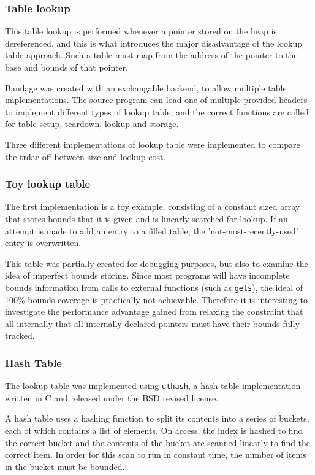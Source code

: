 \subsubsection{Table lookup}

This table lookup is performed whenever a pointer stored on the heap is dereferenced, and this is what introduces the major disadvantage of the lookup table approach.
Such a table must map from the address of the pointer to the base and bounds of that pointer.

Bandage was created with an exchangable backend, to allow multiple table implementations.
The source program can load one of multiple provided headers to implement different types of lookup table, and the correct functions are called for table setup, teardown, lookup and storage.

Three different implementations of lookup table were implemented to compare the trdae-off between size and lookup cost.

\subsubsection{Toy lookup table}

The first implementation is a toy example, consisting of a constant sized array that stores bounds that it is given and is linearly searched for lookup.
If an attempt is made to add an entry to a filled table, the 'not-most-recently-used' entry is overwritten.

This table was partially created for debugging purposes, but also to examine the idea of imperfect bounds storing.
Since most programs will have incomplete bounds information from calls to external functions (such as \verb!gets!), the ideal of 100\% bounds coverage is practically not achievable.
Therefore it is interesting to investigate the performance advantage gained from relaxing the constraint that all internally that all internally declared pointers must have their bounds fully tracked.

\subsubsection{Hash Table}

The lookup table was implemented using \verb!uthash!, a hash table implementation written in C and released under the BSD revised license. 

A hash table uses a hashing function to split its contents into a series of buckets, each of which contains a list of elements.
On access, the index is hashed to find the correct bucket and the contents of the bucket are scanned linearly to find the correct item.
In order for this scan to run in constant time, the number of items in the bucket must be bounded.

